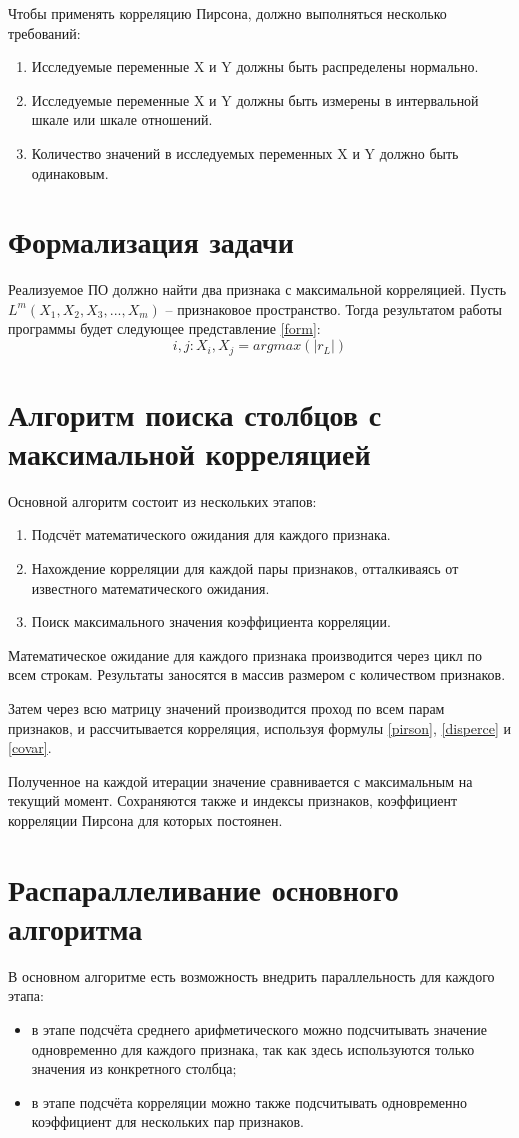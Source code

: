Чтобы применять корреляцию Пирсона, должно выполняться несколько требований:
\begin{enumerate}
	\item Исследуемые переменные X и Y должны быть распределены нормально.
	\item Исследуемые переменные X и Y должны быть измерены в интервальной шкале или шкале отношений.
	\item Количество значений в исследуемых переменных X и Y должно быть одинаковым.
\end{enumerate}

\section{Формализация задачи}
Реализуемое ПО должно найти два признака с максимальной корреляцией. Пусть
$L^m(X_1, X_2, X_3, ... , X_m)$ -- признаковое пространство. Тогда результатом работы программы будет следующее представление \ref{form}:
\begin{equation}\label{form}
	i, j: X_i, X_j = argmax(|r_{L}|)
\end{equation}

\section{Алгоритм поиска столбцов с максимальной корреляцией}
Основной алгоритм состоит из нескольких этапов:
\begin{enumerate}
	\item Подсчёт математического ожидания для каждого признака.
	\item Нахождение корреляции для каждой пары признаков, отталкиваясь от известного математического ожидания.
	\item Поиск максимального значения коэффициента корреляции.
\end{enumerate}
Математическое ожидание для каждого признака производится через цикл по всем строкам.
Результаты заносятся в массив размером с количеством признаков.

Затем через всю матрицу значений производится проход по всем парам признаков, и 
рассчитывается корреляция, используя формулы \ref{pirson}, \ref{disperce} и \ref{covar}.

Полученное на каждой итерации значение сравнивается с максимальным на текущий момент.
Сохраняются также и индексы признаков, коэффициент корреляции Пирсона для которых постоянен.

\section{Распараллеливание основного алгоритма}
В основном алгоритме есть возможность внедрить параллельность для каждого этапа:
\begin{itemize}
	\item в этапе подсчёта среднего арифметического можно подсчитывать значение одновременно для каждого признака, так как здесь используются только значения из конкретного столбца;
	\item в этапе подсчёта корреляции можно также подсчитывать одновременно коэффициент для нескольких пар признаков.
\end{itemize}


